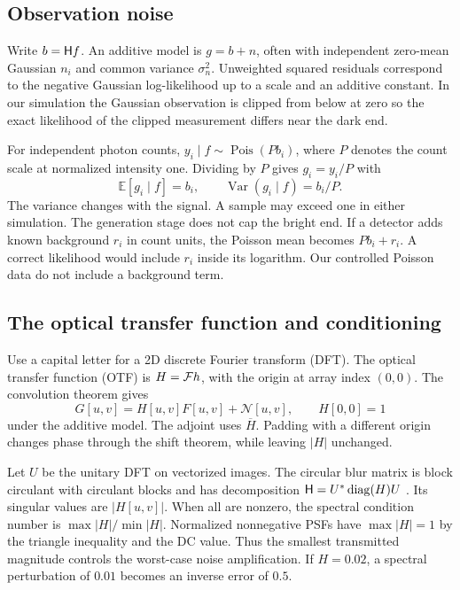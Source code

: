 \subsection{Observation noise}

Write \(b=\mathsf H f\). An additive model is \(g=b+n\), often with independent zero-mean Gaussian \(n_i\) and common variance \(\sigma_n^2\). Unweighted squared residuals correspond to the negative Gaussian log-likelihood up to a scale and an additive constant. In our simulation the Gaussian observation is clipped from below at zero so the exact likelihood of the clipped measurement differs near the dark end.

For independent photon counts, \(y_i\mid f\sim\operatorname{Pois}(P b_i)\), where \(P\) denotes the count scale at normalized intensity one. Dividing by \(P\) gives \(g_i=y_i/P\) with
\begin{equation}
\mathbb E[g_i\mid f]=b_i,\qquad
\operatorname{Var}(g_i\mid f)=b_i/P .
\end{equation}
The variance changes with the signal. A sample may exceed one in either simulation. The generation stage does not cap the bright end. If a detector adds known background \(r_i\) in count units, the Poisson mean becomes \(P b_i+r_i\). A correct likelihood would include \(r_i\) inside its logarithm. Our controlled Poisson data do not include a background term.

\subsection{The optical transfer function and conditioning}

Use a capital letter for a 2D discrete Fourier transform (DFT). The optical transfer function (OTF) is \(H=\mathcal F h\), with the origin at array index \((0,0)\). The convolution theorem gives
\begin{equation}
G[u,v]=H[u,v]F[u,v]+\mathcal N[u,v],\qquad H[0,0]=1
\label{eq:dft}
\end{equation}
under the additive model. The adjoint uses \(\overline H\). Padding with a different origin changes phase through the shift theorem, while leaving \(|H|\) unchanged.

Let \(U\) be the unitary DFT on vectorized images. The circular blur matrix is block circulant with circulant blocks and has decomposition
\(\mathsf H=U^*\operatorname{diag}(H)U\) \citep{hansen}. Its singular values are \(|H[u,v]|\). When all are nonzero, the spectral condition number is \(\max|H|/\min|H|\). Normalized nonnegative PSFs have \(\max|H|=1\) by the triangle inequality and the DC value. Thus the smallest transmitted magnitude controls the worst-case noise amplification. If \(H=0.02\), a spectral perturbation of \(0.01\) becomes an inverse error of \(0.5\).

